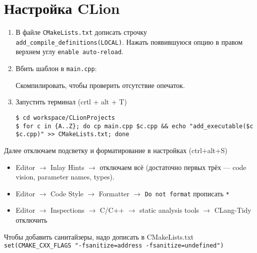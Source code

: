 \section{Настройка CLion}
\begin{enumerate}
    \item В файле \texttt{CMakeLists.txt} дописать строчку \texttt{add\_compile\_definitions(LOCAL)}.
    Нажать появившуюся опцию в правом верхнем углу \texttt{enable auto-reload}.
    \item Вбить шаблон в \texttt{main.cpp}:
    
    Скомпилировать, чтобы проверить отсутствие опечаток.
    \item Запустить терминал (crtl + alt + T)
    \begin{lstlisting}
$ cd workspace/CLionProjects
$ for c in {A..Z}; do cp main.cpp $c.cpp && echo "add_executable($c $c.cpp)" >> CMakeLists.txt; done\end{lstlisting}
\end{enumerate}
Далее отключаем подсветку и форматирование в настройках (ctrl+alt+S)
\begin{itemize}
    \item Editor $\to$ Inlay Hints $\to$ отключаем всё (достаточно первых трёх --- code vision, parameter names, types).
    \item Editor $\to$ Code Style $\to$ Formatter $\to$ \texttt{Do not format} прописать \texttt{*}
    \item Editor $\to$ Inspections $\to$ C/C++ $\to$ static analysis tools $\to$ CLang-Tidy отключить
\end{itemize}
Чтобы добавить санитайзеры, надо дописать в CMakeLists.txt \texttt{set(CMAKE\_CXX\_FLAGS "-fsanitize=address -fsanitize=undefined")}